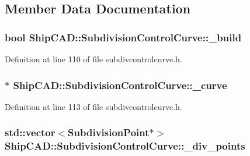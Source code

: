\subsection{Member Data Documentation}
\hypertarget{classShipCAD_1_1SubdivisionControlCurve_a1e4dd9968f46becb714e44709d0da418}{
\subsubsection[{\-\_\-build}]{\setlength{\rightskip}{0pt plus 5cm}bool Ship\-C\-A\-D\-::\-Subdivision\-Control\-Curve\-::\-\_\-build\hspace{0.3cm}{\ttfamily [protected]}}}\label{classShipCAD_1_1SubdivisionControlCurve_a1e4dd9968f46becb714e44709d0da418}


Definition at line 110 of file subdivcontrolcurve.\-h.

\hypertarget{classShipCAD_1_1SubdivisionControlCurve_a115a5b67ed81a3012ccb02a25b3d2c24}{
\subsubsection[{\-\_\-curve}]{$\ast$ Ship\-C\-A\-D\-::\-Subdivision\-Control\-Curve\-::\-\_\-curve\hspace{0.3cm}{\ttfamily [protected]}}}\label{classShipCAD_1_1SubdivisionControlCurve_a115a5b67ed81a3012ccb02a25b3d2c24}


Definition at line 113 of file subdivcontrolcurve.\-h.

\hypertarget{classShipCAD_1_1SubdivisionControlCurve_af91dbc96b703fe618567326cca21d82c}{
\subsubsection[{\-\_\-div\-\_\-points}]{\setlength{\rightskip}{0pt plus 5cm}std\-::vector$<${\bf Subdivision\-Point}$\ast$$>$ Ship\-C\-A\-D\-::\-Subdivision\-Control\-Curve\-::\-\_\-div\-\_\-points\hspace{0.3cm}{\ttfamily [protected]}}}\label{classShipCAD_1_1SubdivisionControlCurve_af91dbc96b703fe618567326cca21d82c}


